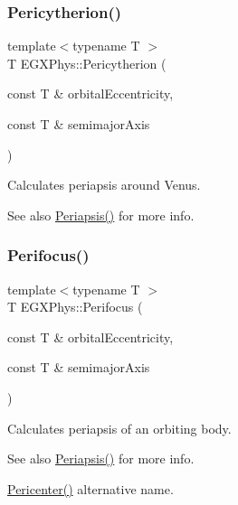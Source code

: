\subsubsection{\texorpdfstring{Pericytherion()}{Pericytherion()}}
{\footnotesize\ttfamily template$<$typename T $>$ \\
T E\+G\+X\+Phys\+::\+Pericytherion (\begin{DoxyParamCaption}\item[{const T \&}]{orbital\+Eccentricity,  }\item[{const T \&}]{semimajor\+Axis }\end{DoxyParamCaption})}



Calculates periapsis around Venus. 

\begin{DoxySeeAlso}{See also}
\hyperlink{group___periapsis_ga4414ac75539371ec874a3d25cad6c9fe}{Periapsis()} for more info. 
\end{DoxySeeAlso}
\mbox{\label{group___periapsis_gaff62669fb364a245cb85f9a91d8ea71f}} 
\subsubsection{\texorpdfstring{Perifocus()}{Perifocus()}}
{\footnotesize\ttfamily template$<$typename T $>$ \\
T E\+G\+X\+Phys\+::\+Perifocus (\begin{DoxyParamCaption}\item[{const T \&}]{orbital\+Eccentricity,  }\item[{const T \&}]{semimajor\+Axis }\end{DoxyParamCaption})}



Calculates periapsis of an orbiting body. 

\begin{DoxySeeAlso}{See also}
\hyperlink{group___periapsis_ga4414ac75539371ec874a3d25cad6c9fe}{Periapsis()} for more info. 

\hyperlink{group___periapsis_gac4c419a87a5802cf6afc98f50792e99f}{Pericenter()} alternative name. 
\end{DoxySeeAlso}
\mbox{\label{group___periapsis_ga074fecab96b90bebffa512a37e52d90b}} 
